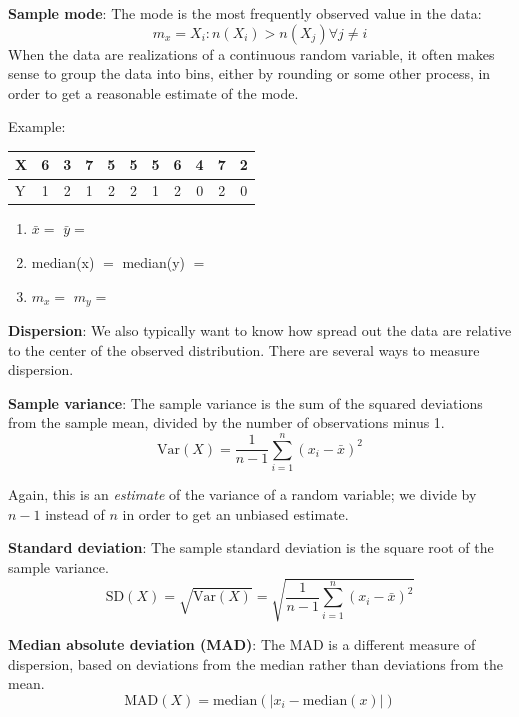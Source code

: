 \documentclass[]{book}
\newcommand{\Var}{\mathrm{Var}}
\newcommand{\SD}{\mathrm{SD}}
\theoremstyle{definition}
\theoremstyle{definition}
\theoremstyle{definition}
\theoremstyle{remark}
\begin{document}
\textbf{Sample mode}: The mode is the most frequently observed value in
the data: \[m_x = X_i : n(X_i) > n(X_j) \forall j\neq i\] When the data
are realizations of a continuous random variable, it often makes sense
to group the data into bins, either by rounding or some other process,
in order to get a reasonable estimate of the mode.

\begin{framed}
Example:  
\begin{center}
\begin{tabular}{|l|cccccccccc|}
\hline
X & 6 & 3 & 7 & 5 & 5 & 5 & 6 & 4 & 7 & 2\\
\hline
Y & 1 & 2 & 1 & 2 & 2 & 1 & 2 & 0 & 2 & 0\\
\hline
\end{tabular}
\end{center}

\begin{enumerate}
\item $\bar{x} = $ \hspace{3.1cm} $\bar{y} = $
\item median(x) $ = $ \hspace{1.5cm} median(y) $ = $
\item $m_x = $ \hspace{2.75cm} $m_y =$\\
\end{enumerate}
\end{framed}

\textbf{Dispersion}: We also typically want to know how spread out the
data are relative to the center of the observed distribution. There are
several ways to measure dispersion.

\textbf{Sample variance}: The sample variance is the sum of the squared
deviations from the sample mean, divided by the number of observations
minus 1. \[ \Var(X) = \frac{1}{n-1}\sum_{i = 1}^n (x_i - \bar{x})^2\]

Again, this is an \textit{estimate} of the variance of a random
variable; we divide by \(n - 1\) instead of \(n\) in order to get an
unbiased estimate.

\textbf{Standard deviation}: The sample standard deviation is the square
root of the sample variance.
\[ \SD(X) = \sqrt{\Var(X)} = \sqrt{\frac{1}{n-1}\sum_{i = 1}^n (x_i - \bar{x})^2}\]

\textbf{Median absolute deviation (MAD)}: The MAD is a different measure
of dispersion, based on deviations from the median rather than
deviations from the mean.
\[\mathrm{MAD}(X) = \mathrm{median}\left(|x_i - \mathrm{median}(x)|\right)\]
\end{document}
